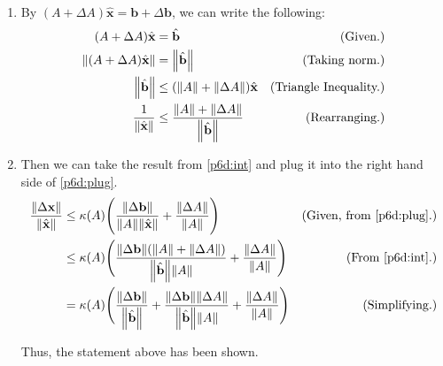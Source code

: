 \begin{solution}
\begin{enumerate}
    \item By $(A + \Delta A) \hat{\textbf{x}} = \textbf{b} + \Delta \textbf{b}$, we can write the following:
    \alignbreak
    \begin{align}
        (A + \Delta A) \hat{\textbf{x}} &= \hat{\textbf{b}} &\text{(Given.)}\nonumber\\
        \norm{(A + \Delta A) \hat{\textbf{x}}} &= \norm{\hat{\textbf{b}}} &\text{(Taking norm.)}\nonumber\\
        \norm{\hat{\textbf{b}}} & \leq (\norm{A} + \norm{\Delta A}) \hat{\textbf{x}} &\text{(Triangle Inequality.)}\nonumber\\
        \frac{1}{\norm{\hat{\textbf{x}}}} &\leq \frac{\norm{A} + \norm{\Delta A}}{\norm{\hat{\textbf{b}}}} &\text{(Rearranging.)} \label{p6d:int}
    \end{align}
    \alignbreak
    \newpage
    \item Then we can take the result from \ref{p6d:int} and plug it into the right hand side of \ref{p6d:plug}.
    \alignbreak
    \begin{align}
        \frac{\norm{\Delta \textbf{x}}}{\norm{\hat{\textbf{x}}}} &\leq \kappa(A)\Bigg( \frac{\norm{\Delta \textbf{b}}}{\norm{A}\norm{\hat{\textbf{x}}}} + \frac{\norm{\Delta A}}{\norm{A}} \Bigg) &\text{(Given, from \ref{p6d:plug}.)}\nonumber\\
        &\leq \kappa(A)\Bigg( \frac{\norm{\Delta \textbf{b}}(\norm{A} + \norm{\Delta A})}{\norm{\hat{\textbf{b}}}\norm{A}} + \frac{\norm{\Delta A}}{\norm{A}}\Bigg) &\text{(From \ref{p6d:int}.)}\nonumber\\
        &= \kappa(A)\Bigg( \frac{\norm{\Delta \textbf{b}}}{\norm{\hat{\textbf{b}}}} + \frac{\norm{\Delta \textbf{b}}\norm{\Delta A}}{\norm{\hat{\textbf{b}}}\norm{A}}+ \frac{\norm{\Delta A}}{\norm{A}}\Bigg)&\text{(Simplifying.)}\nonumber
    \end{align}
    \alignbreak

    Thus, the statement above has been shown.  
\end{enumerate}
\end{solution}


